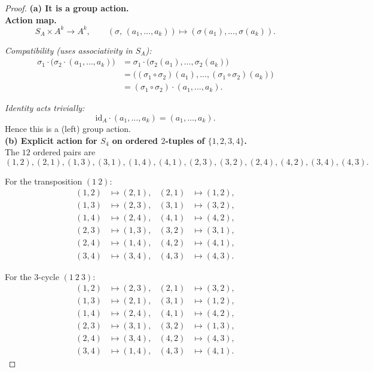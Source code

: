 \documentclass[12pt]{article}
\theoremstyle{definition}
\begin{document}
\begin{proof}
\noindent\textbf{(a) It is a group action.}\\
\noindent\textbf{Action map.}
\[
S_A\times A^k\longrightarrow A^k,\qquad
(\sigma,\,(a_1,\dots,a_k))\longmapsto (\sigma(a_1),\dots,\sigma(a_k)).
\]

\noindent\emph{Compatibility (uses associativity in $S_A$):}
\[
\begin{aligned}
\sigma_1\cdot\bigl(\sigma_2\cdot(a_1,\dots,a_k)\bigr)
  &=\sigma_1\cdot\bigl(\sigma_2(a_1),\dots,\sigma_2(a_k)\bigr)\\
  &=\bigl((\sigma_1\circ\sigma_2)(a_1),\dots,(\sigma_1\circ\sigma_2)(a_k)\bigr)\\
  &=(\sigma_1\circ\sigma_2)\cdot(a_1,\dots,a_k).
\end{aligned}
\]

\noindent\emph{Identity acts trivially:}
\[
\mathrm{id}_A\cdot(a_1,\dots,a_k)=(a_1,\dots,a_k).
\]
Hence this is a (left) group action.\\[6pt]

\noindent\textbf{(b) Explicit action for $S_4$ on ordered $2$-tuples of $\{1,2,3,4\}$.}\\
The $12$ ordered pairs are
\[
(1,2),(2,1),(1,3),(3,1),(1,4),(4,1),(2,3),(3,2),(2,4),(4,2),(3,4),(4,3).
\]

\noindent For the transposition $(1\ 2)$:
\[
\begin{aligned}
(1,2)&\mapsto(2,1), & (2,1)&\mapsto(1,2),\\
(1,3)&\mapsto(2,3), & (3,1)&\mapsto(3,2),\\
(1,4)&\mapsto(2,4), & (4,1)&\mapsto(4,2),\\
(2,3)&\mapsto(1,3), & (3,2)&\mapsto(3,1),\\
(2,4)&\mapsto(1,4), & (4,2)&\mapsto(4,1),\\
(3,4)&\mapsto(3,4), & (4,3)&\mapsto(4,3).
\end{aligned}
\]

\noindent For the $3$-cycle $(1\ 2\ 3)$:
\[
\begin{aligned}
(1,2)&\mapsto(2,3), & (2,1)&\mapsto(3,2),\\
(1,3)&\mapsto(2,1), & (3,1)&\mapsto(1,2),\\
(1,4)&\mapsto(2,4), & (4,1)&\mapsto(4,2),\\
(2,3)&\mapsto(3,1), & (3,2)&\mapsto(1,3),\\
(2,4)&\mapsto(3,4), & (4,2)&\mapsto(4,3),\\
(3,4)&\mapsto(1,4), & (4,3)&\mapsto(4,1).
\end{aligned}
\]
\end{proof}
\end{document}
